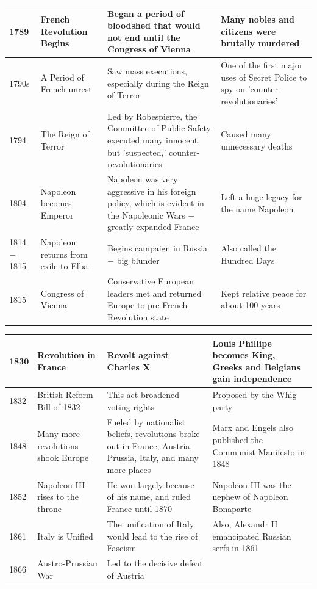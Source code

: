 \documentclass[12pt]{article}
\begin{document}
\begin{enumerate}
\begin{tabular}{|p{}|p{}|p{}|p{}|}
\hline
1789 & French Revolution Begins & Began a period of bloodshed that would not end until the Congress of Vienna  & Many nobles and citizens were brutally murdered  \\
\hline
1790s & A Period of French unrest  & Saw mass executions, especially during the Reign of Terror  & One of the first major uses of Secret Police to spy on 'counter-revolutionaries'  \\
\hline
1794 & The Reign of Terror  & Led by Robespierre, the Committee of Public Safety executed many innocent, but 'suspected,' counter-revolutionaries  & Caused many unnecessary deaths  \\
\hline
1804 & Napoleon becomes Emperor & Napoleon was very aggressive in his foreign policy, which is evident in the Napoleonic Wars $-$ greatly expanded France  & Left a huge legacy for the name Napoleon  \\
\hline
1814$-$1815 & Napoleon returns from exile to Elba & Begins campaign in Russia $-$ big blunder & Also called the Hundred Days \\
\hline
1815 & Congress of Vienna & Conservative European leaders met and returned Europe to pre-French Revolution state  & Kept relative peace for about 100 years  \\
\hline
\end{tabular}
\newpage
\hspace{-25pt}\begin{tabular}{|p{}|p{}|p{}|p{}|}
\hline
1830 & Revolution in France & Revolt against Charles X  & Louis Phillipe becomes King, Greeks and Belgians gain independence  \\
\hline
1832 & British Reform Bill of 1832  & This act broadened voting rights  & Proposed by the Whig party  \\
\hline
1848 & Many more revolutions shook Europe & Fueled by nationalist beliefs, revolutions broke out in France, Austria, Prussia, Italy, and many more places  & Marx and Engels also published the Communist Manifesto in 1848 \\
\hline
1852 & Napoleon III rises to the throne  & He won largely because of his name, and ruled France until 1870  & Napoleon III was the nephew of Napoleon Bonaparte  \\
\hline
1861 & Italy is Unified  & The unification of Italy would lead to the rise of Fascism  & Also, Alexandr II emancipated Russian serfs in 1861  \\
\hline
1866 & Austro-Prussian War  & Led to the decisive defeat of Austria  & \\

\end{tabular}
\end{enumerate}
\end{document}

